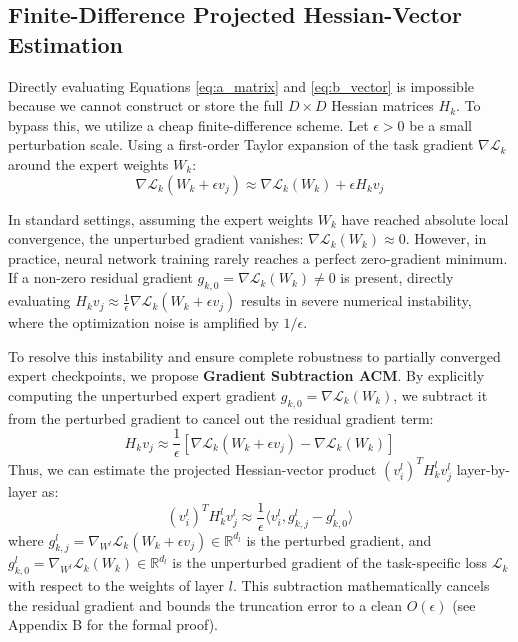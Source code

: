 \subsection{Finite-Difference Projected Hessian-Vector Estimation}
Directly evaluating Equations \ref{eq:a_matrix} and \ref{eq:b_vector} is impossible because we cannot construct or store the full $D \times D$ Hessian matrices $H_k$. To bypass this, we utilize a cheap finite-difference scheme. Let $\epsilon > 0$ be a small perturbation scale. Using a first-order Taylor expansion of the task gradient $\nabla \mathcal{L}_k$ around the expert weights $W_k$:
\begin{equation}
    \nabla \mathcal{L}_k(W_k + \epsilon v_j) \approx \nabla \mathcal{L}_k(W_k) + \epsilon H_k v_j
\end{equation}

In standard settings, assuming the expert weights $W_k$ have reached absolute local convergence, the unperturbed gradient vanishes: $\nabla \mathcal{L}_k(W_k) \approx 0$. However, in practice, neural network training rarely reaches a perfect zero-gradient minimum. If a non-zero residual gradient $g_{k,0} = \nabla \mathcal{L}_k(W_k) \neq 0$ is present, directly evaluating $H_k v_j \approx \frac{1}{\epsilon} \nabla \mathcal{L}_k(W_k + \epsilon v_j)$ results in severe numerical instability, where the optimization noise is amplified by $1/\epsilon$.

To resolve this instability and ensure complete robustness to partially converged expert checkpoints, we propose \textbf{Gradient Subtraction ACM}. By explicitly computing the unperturbed expert gradient $g_{k,0} = \nabla \mathcal{L}_k(W_k)$, we subtract it from the perturbed gradient to cancel out the residual gradient term:
\begin{equation}
    H_k v_j \approx \frac{1}{\epsilon} \left[ \nabla \mathcal{L}_k(W_k + \epsilon v_j) - \nabla \mathcal{L}_k(W_k) \right]
\end{equation}
Thus, we can estimate the projected Hessian-vector product $(v_i^l)^T H_k^l v_j^l$ layer-by-layer as:
\begin{equation}
    (v_i^l)^T H_k^l v_j^l \approx \frac{1}{\epsilon} \langle v_i^l, g_{k,j}^l - g_{k,0}^l \rangle
\end{equation}
where $g_{k,j}^l = \nabla_{W^l} \mathcal{L}_k(W_k + \epsilon v_j) \in \mathbb{R}^{d_l}$ is the perturbed gradient, and $g_{k,0}^l = \nabla_{W^l} \mathcal{L}_k(W_k) \in \mathbb{R}^{d_l}$ is the unperturbed gradient of the task-specific loss $\mathcal{L}_k$ with respect to the weights of layer $l$. This subtraction mathematically cancels the residual gradient and bounds the truncation error to a clean $O(\epsilon)$ (see Appendix B for the formal proof).

